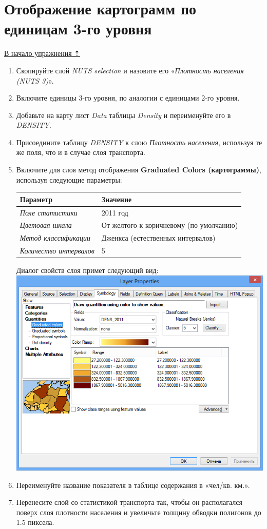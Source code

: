 \documentclass[]{book}
\theoremstyle{definition}
\theoremstyle{definition}
\theoremstyle{definition}
\theoremstyle{remark}
\begin{document}
\hypertarget{stat-map-economic-choropleths3}{%
\section{Отображение картограмм по единицам 3-го
уровня}\label{stat-map-economic-choropleths3}}

\protect\hyperlink{stat-map-economic}{В начало упражнения ⇡}

\begin{enumerate}
\def\labelenumi{\arabic{enumi}.}
\item
  Скопируйте слой \emph{NUTS selection} и назовите его «\emph{Плотность
  населения (NUTS 3)}».
\item
  Включите единицы 3-го уровня, по аналогии с единицами 2-го уровня.
\item
  Добавьте на карту лист \emph{Data} таблицы \emph{Density} и
  переименуйте его в \emph{DENSITY}.
\item
  Присоедините таблицу \emph{DENSITY} к слою \emph{Плотность населения},
  используя те же поля, что и в случае слоя транспорта.
\item
  Включите для слоя метод отображения \textbf{Graduated Colors
  (картограммы)}, используя следующие параметры:

  \begin{longtable}[]{@{}ll@{}}
  \toprule
  Параметр & Значение\tabularnewline
  \midrule
  \endhead
  \emph{Поле статистики} & 2011 год\tabularnewline
  \emph{Цветовая шкала} & От желтого к коричневому (по
  умолчанию)\tabularnewline
  \emph{Метод классификации} & Дженкса (естественных
  интервалов)\tabularnewline
  \emph{Количество интервалов} & 5\tabularnewline
  \bottomrule
  \end{longtable}

  Диалог свойств слоя примет следующий вид:
  \includegraphics{images/Ex08/image26.png}
\item
  Переименуйте название показателя в таблице содержания в «чел/кв. км.».
\item
  Перенесите слой со статистикой транспорта так, чтобы он располагался
  поверх слоя плотности населения и увеличьте толщину обводки полигонов
  до 1.5 пиксела.
\end{enumerate}
\end{document}
